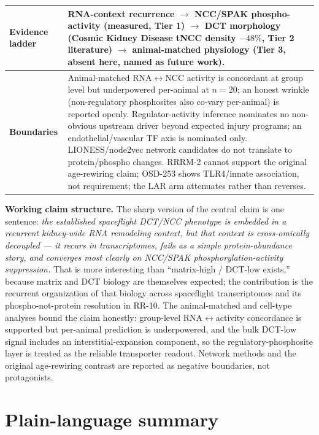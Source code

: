 \documentclass[11pt]{article}
\begin{document}
\begin{tabularx}{\textwidth}{>{\bfseries}p{}X}
\midrule
Evidence ladder & RNA-context recurrence $\rightarrow$ NCC/SPAK phospho-activity (measured, Tier 1) $\rightarrow$ DCT morphology (Cosmic Kidney Disease tNCC density $-48\%$, Tier 2 literature) $\rightarrow$ animal-matched physiology (Tier 3, absent here, named as future work). \\
\midrule
Boundaries & Animal-matched RNA$\leftrightarrow$NCC activity is concordant at group level but underpowered per-animal at $n=20$; an honest wrinkle (non-regulatory phosphosites also co-vary per-animal) is reported openly. Regulator-activity inference nominates no non-obvious upstream driver beyond expected injury programs; an endothelial/vascular TF axis is nominated only. LIONESS/node2vec network candidates do not translate to protein/phospho changes. RRRM-2 cannot support the original age-rewiring claim; OSD-253 shows TLR4/innate association, not requirement; the LAR arm attenuates rather than reverses. \\
\bottomrule
\end{tabularx}
\normalsize

\vspace{0.8em}
\noindent\textbf{Working claim structure.}
The sharp version of the central claim is one sentence: \emph{the established spaceflight DCT/NCC phenotype is embedded in a recurrent kidney-wide RNA remodeling context, but that context is cross-omically decoupled --- it recurs in transcriptomes, fails as a simple protein-abundance story, and converges most clearly on NCC/SPAK phosphorylation-activity suppression.} That is more interesting than ``matrix-high / DCT-low exists,'' because matrix and DCT biology are themselves expected; the contribution is the recurrent organization of that biology across spaceflight transcriptomes and its phospho-not-protein resolution in RR-10. The animal-matched and cell-type analyses bound the claim honestly: group-level RNA$\leftrightarrow$activity concordance is supported but per-animal prediction is underpowered, and the bulk DCT-low signal includes an interstitial-expansion component, so the regulatory-phosphosite layer is treated as the reliable transporter readout. Network methods and the original age-rewiring contrast are reported as negative boundaries, not protagonists.

\clearpage

\section*{Plain-language summary}
\end{document}
